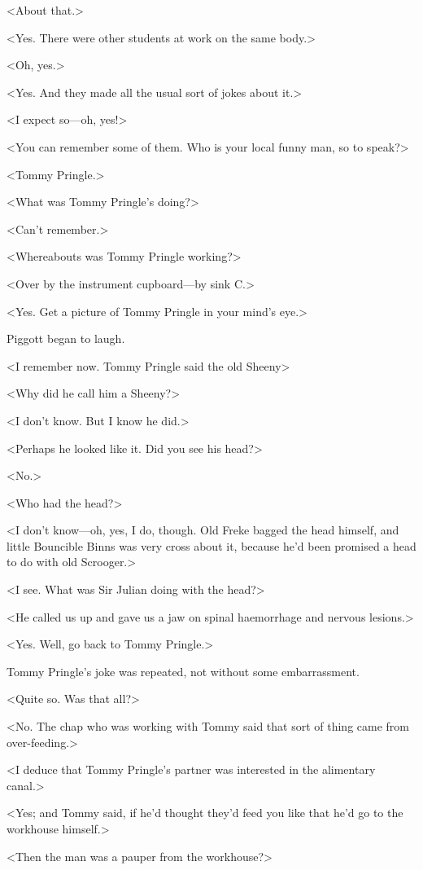 <About that.>

<Yes. There were other students at work on the same body.>

<Oh, yes.>

<Yes. And they made all the usual sort of jokes about it.>

<I expect so—oh, yes!>

<You can remember some of them. Who is your local funny man, so to speak?>

<Tommy Pringle.>

<What was Tommy Pringle's doing?>

<Can't remember.>

<Whereabouts was Tommy Pringle working?>

<Over by the instrument cupboard—by sink C\@.>

<Yes. Get a picture of Tommy Pringle in your mind's eye.>

Piggott began to laugh.

<I remember now. Tommy Pringle said the old Sheeny\longdash>

<Why did he call him a Sheeny?>

<I don't know. But I know he did.>

<Perhaps he looked like it. Did you see his head?>

<No.>

<Who had the head?>

<I don't know—oh, yes, I do, though. Old Freke bagged the head himself, and little Bouncible Binns was very cross about it, because he'd been promised a head to do with old Scrooger.>

<I see. What was Sir Julian doing with the head?>

<He called us up and gave us a jaw on spinal haemorrhage and nervous lesions.>

<Yes. Well, go back to Tommy Pringle.>

Tommy Pringle's joke was repeated, not without some embarrassment.

<Quite so. Was that all?>

<No. The chap who was working with Tommy said that sort of thing came from over-feeding.>

<I deduce that Tommy Pringle's partner was interested in the alimentary canal.>

<Yes; and Tommy said, if he'd thought they'd feed you like that he'd go to the workhouse himself.>

<Then the man was a pauper from the workhouse?>

